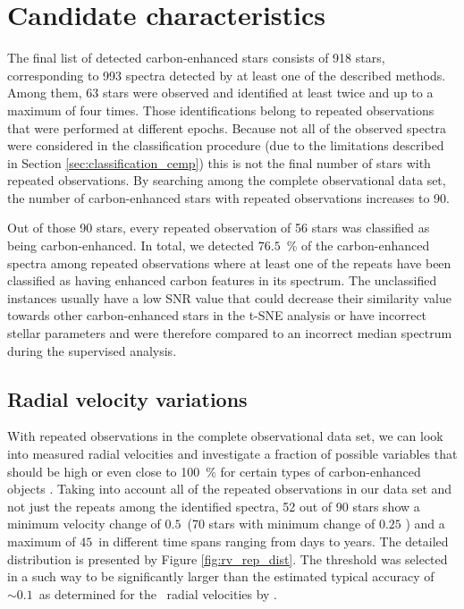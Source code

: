 \section{Candidate characteristics}
\label{sec:analysis_cemp}
The final list of detected carbon-enhanced stars consists of 918 stars, corresponding to 993 spectra detected by at least one of the described methods. Among them, 63 stars were observed and identified at least twice and up to a maximum of four times. Those identifications belong to repeated observations that were performed at different epochs. Because not all of the observed spectra were considered in the classification procedure (due to the limitations described in Section \ref{sec:classification_cemp}) this is not the final number of stars with repeated observations. By searching among the complete observational data set, the number of carbon-enhanced stars with repeated observations increases to 90.

Out of those 90 stars, every repeated observation of 56 stars was classified as being carbon-enhanced. In total, we detected $76.5$~\% of the carbon-enhanced spectra among repeated observations where at least one of the repeats have been classified as having enhanced carbon features in its spectrum. The unclassified instances usually have a low SNR value that could decrease their similarity value towards other carbon-enhanced stars in the t-SNE analysis or have incorrect stellar parameters and were therefore compared to an incorrect median spectrum during the supervised analysis.

\subsection{Radial velocity variations}
\label{sec:binaries}
With repeated observations in the complete observational data set, we can look into measured radial velocities and investigate a fraction of possible variables that should be high or even close to 100~\% for certain types of carbon-enhanced objects \citet{2016ApJ...826...85S}. Taking into account all of the repeated observations in our data set and not just the repeats among the identified spectra, 52 out of 90 stars show a minimum velocity change of $0.5$~\kms (70 stars with minimum change of $0.25$ \kms) and a maximum of $45$~\kms in different time spans ranging from days to years. The detailed distribution is presented by Figure \ref{fig:rv_rep_dist}. The threshold was selected in a such way to be significantly larger than the estimated typical accuracy of $\sim0.1$~\kms as determined for the \Gh\ radial velocities by \citet{2018arXiv180406344Z}.

